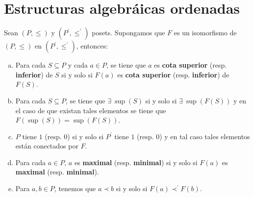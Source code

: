 \section{Estructuras algebráicas ordenadas}

  \begin{lemma}
    \PN Sean $(P, \leq)$ y $(P^{\prime}, \leq^{\prime})$ posets. Supongamos que $F$ es un isomorfismo de $(P, \leq)$ en
    $(P^{\prime}, \leq^{\prime})$, entonces:

    \begin{enumerate}[a)]
      \item Para cada $S \subseteq P$ y cada $a \in P$, se tiene que $a$ es \textbf{cota superior} (resp.
        \textbf{inferior}) de $S$ si y solo si $F(a)$ es \textbf{cota superior} (resp. \textbf{inferior}) de $F(S)$.
      \item Para cada $S \subseteq P$, se tiene que $\exists \ \sup (S)$ si y solo si $\exists \ \sup (F(S))$ y en el
        caso de que existan tales elementos se tiene que $F(\sup (S)) = \sup (F(S))$.
      \item $P$ tiene $1$ (resp. $0$) si y solo si $P^{\prime }$ tiene $1$ (resp. $0$) y en tal caso tales elementos
        están conectados por $F$.
      \item Para cada $a \in P$, $a$ es \textbf{maximal} (resp. \textbf{minimal}) si y solo si $F(a)$ es
        \textbf{maximal} (resp. \textbf{minimal}).
      \item Para $a, b \in P$, tenemos que $a \prec b$ si y solo si $F(a) \prec^{\prime} F(b)$.
    \end{enumerate}
  \end{lemma}
